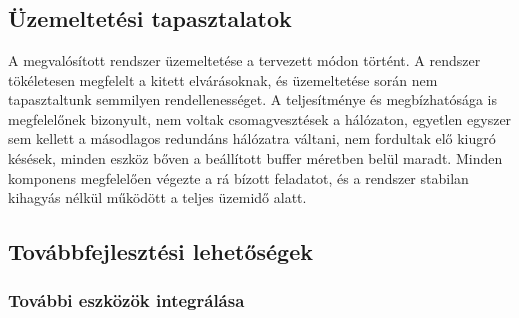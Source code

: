 \chapter{\FurtherDevelopment}

\section{Üzemeltetési tapasztalatok}

A megvalósított rendszer üzemeltetése a tervezett módon történt. A rendszer
tökéletesen megfelelt a kitett elvárásoknak, és üzemeltetése során nem
tapasztaltunk semmilyen rendellenességet. A teljesítménye és megbízhatósága is megfelelőnek bizonyult, nem 
voltak csomagvesztések a hálózaton, egyetlen egyszer sem kellett a másodlagos redundáns hálózatra
váltani, nem fordultak elő kiugró késések, minden eszköz bőven a beállított buffer méretben belül maradt.
Minden komponens megfelelően végezte a rá bízott feladatot, és a rendszer
stabilan kihagyás nélkül működött a teljes üzemidő alatt. 


\section{Továbbfejlesztési lehetőségek}


\subsection{További eszközök integrálása}

